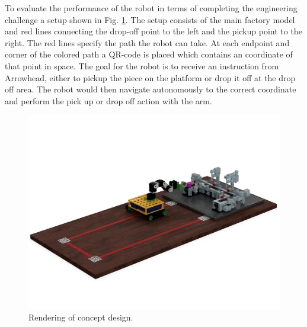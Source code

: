To evaluate the performance of the robot in terms of completing the engineering challenge a setup shown in Fig. \ref{fig:factory_setup}. The setup consists of the main factory model and red lines connecting the drop-off point to the left and the pickup point to the right. The red lines specify the path the robot can take. At each endpoint and corner of the colored path a QR-code is placed which contains an coordinate of that point in space. The goal for the robot is to receive an instruction from Arrowhead, either to pickup the piece on the platform or drop it off at the drop off area. The robot would then navigate autonomously to the correct coordinate and perform the pick up or drop off action with the arm. 

\begin{figure}
    \centering
    \includegraphics[width=0.7\columnwidth]{chapters/img/evaluation_setup.png}
    \caption{Rendering of concept design.}
    \label{fig:factory_setup}
\end{figure}

